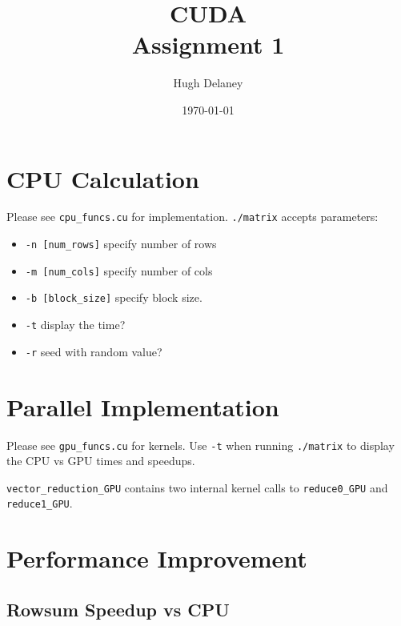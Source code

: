 \documentclass[a4paper, fleqn]{article}
\date{\today}
\author{Hugh Delaney}
\title{CUDA \\ Assignment 1}
\begin{document}
\maketitle
        \section{CPU Calculation}%
        Please see \texttt{cpu\_funcs.cu} for implementation. \texttt{./matrix} accepts parameters:
        \begin{itemize}
                \item \texttt{-n [num\_rows]} specify number of rows
                \item \texttt{-m [num\_cols]} specify number of cols
                \item \texttt{-b [block\_size]} specify block size.
                \item \texttt{-t} display the time?
                \item \texttt{-r} seed with random value?
        \end{itemize}
        \section{Parallel Implementation}%
        Please see \texttt{gpu\_funcs.cu} for kernels. Use \texttt{-t} when running \texttt{./matrix} to display the CPU vs GPU times and speedups. 

        \texttt{vector\_reduction\_GPU} contains two internal kernel calls to \texttt{reduce0\_GPU} and \texttt{reduce1\_GPU}.  
        \section{Performance Improvement}%
\subsection{Rowsum Speedup vs CPU}%
\end{document}
